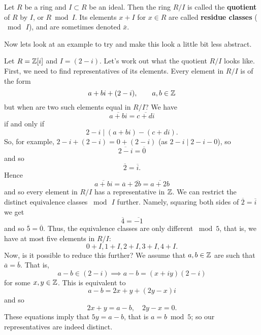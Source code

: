 \begin{definition}[Quotient]
    Let $R$ be a ring and $I \subset R$ be an ideal. 
    Then the ring $R/I$ is called the \textbf{quotient} of $R$ by $I$, or $R \bmod I$.
    Its elements $x + I$ for $x \in R$ are called \textbf{residue classes} ($\bmod \, I$), and are sometimes denoted $\bar x$.
\end{definition}

Now lets look at an example to try and make this look a little bit less abstract.

\begin{example}
    Let $R = \mathbb{Z}[i]$ and $I = (2 - i)$. Let's work out what the quotient $R / I$ looks like. First, we need to find representatives of its elements. Every element in $R / I$ is of the form
    \[ a + bi + (2 - i), \qquad a, b \in \mathbb{Z} \]
    but when are two such elements equal in $R / I$? 
    We have
    \[ \overline{a + bi} = \overline{c + di} \]
    if and only if 
    \[ 2 - i \mid (a + bi) - (c + di). \]
    So, for example, $2 - i + (2 - i) = 0 + (2 - i)$ (as $2 - i \mid 2 - i - 0$), so
    \[ \overline{2 - i} = \overline 0 \]
    and so
    \[ \overline 2 = \overline i. \]
    Hence
    \[ \overline{a + bi} = \overline{a} + \overline{2b} = \overline{a + 2b} \]
    and so every element in $R/I$ has a representative in $\mathbb{Z}$. 
    We can restrict the distinct equivalence classes $\bmod \, I$ further. 
    Namely, squaring both sides of $\overline 2 = \overline i$ we get
    \[ \overline 4 = \overline{-1} \]
    and so $\overline 5 = \overline 0$.
    Thus, the equivalence classes are only different $\bmod 5$, that is, we have at most five elements in $R/I$:
    \[ 0 + I, 1 + I, 2 + I, 3 + I, 4 + I. \]
    Now, is it possible to reduce this further? 
    We assume that $a, b \in \mathbb{Z}$ are such that $\overline a = \overline b$. 
    That is, 
    \[ a - b \in (2 - i) \implies a - b = (x + iy)(2 - i) \]
    for some $x, y \in \mathbb{Z}$.
    This is equivalent to 
    \[ a - b = 2x + y + (2y - x)i \]
    and so
    \[ 2x + y = a - b, \quad 2y - x = 0. \]
    These equations imply that $5y = a - b$, that is $a = b \bmod 5$; so our representatives are indeed distinct.
\end{example}
